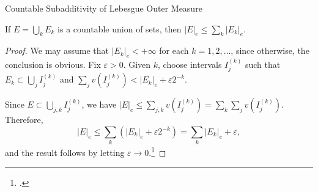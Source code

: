 \documentclass[UTF8,a4paper,10pt]{article}
\begin{document}
\begin{mybox}{Countable Subadditivity of Lebesgue Outer Measure}

  \setcounter{section}{3} 
  \setcounter{theorem}{3}
  
  \begin{theorem}\label{thm:3.4}
    If $E = \bigcup_{k} E_k$ is a countable union of sets, then $|E|_e \leq \sum_{k} |E_k|_e$.
    \end{theorem}
    
    \begin{proof}
    We may assume that $|E_k|_e < +\infty$ for each $k = 1, 2, \ldots$, since otherwise, the conclusion is obvious. Fix $\varepsilon > 0$. Given $k$, choose intervals $I^{(k)}_j$ such that $E_k \subset \bigcup_j I^{(k)}_j$ and $\sum_j v(I^{(k)}_j) < |E_k|_e + \varepsilon 2^{-k}$.
    
    Since $E \subset \bigcup_{j,k} I^{(k)}_j$, we have $|E|_e \leq \sum_{j,k} v(I^{(k)}_j) = \sum_k \sum_j v(I^{(k)}_j)$. Therefore,
    \[|E|_e \leq \sum_k (|E_k|_e + \varepsilon 2^{-k}) = \sum_k |E_k|_e + \varepsilon,\]
    and the result follows by letting $\varepsilon \to 0$.\footcite[][42]{Wheeden_Zygmund_2015}
    \end{proof}
     

\end{mybox}
  
\end{document}
